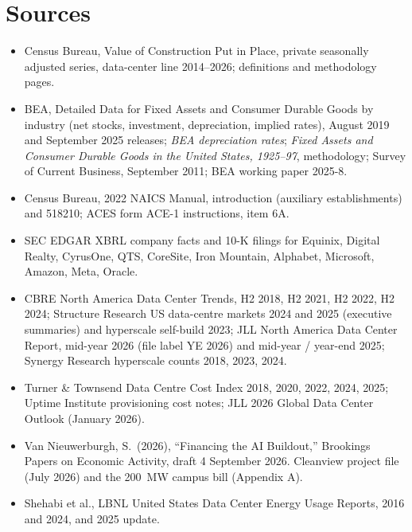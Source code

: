 \documentclass[11pt]{article}
\begin{document}
\section*{Sources}

\begin{itemize}
  \item Census Bureau, Value of Construction Put in Place, private seasonally adjusted series, data-center line 2014--2026; definitions and methodology pages.
  \item BEA, Detailed Data for Fixed Assets and Consumer Durable Goods by industry (net stocks, investment, depreciation, implied rates), August 2019 and September 2025 releases; \emph{BEA depreciation rates}; \emph{Fixed Assets and Consumer Durable Goods in the United States, 1925--97}, methodology; Survey of Current Business, September 2011; BEA working paper 2025-8.
  \item Census Bureau, 2022 NAICS Manual, introduction (auxiliary establishments) and 518210; ACES form ACE-1 instructions, item 6A.
  \item SEC EDGAR XBRL company facts and 10-K filings for Equinix, Digital Realty, CyrusOne, QTS, CoreSite, Iron Mountain, Alphabet, Microsoft, Amazon, Meta, Oracle.
  \item CBRE North America Data Center Trends, H2 2018, H2 2021, H2 2022, H2 2024; Structure Research US data-centre markets 2024 and 2025 (executive summaries) and hyperscale self-build 2023; JLL North America Data Center Report, mid-year 2026 (file label YE 2026) and mid-year / year-end 2025; Synergy Research hyperscale counts 2018, 2023, 2024.
  \item Turner \& Townsend Data Centre Cost Index 2018, 2020, 2022, 2024, 2025; Uptime Institute provisioning cost notes; JLL 2026 Global Data Center Outlook (January 2026).
  \item Van Nieuwerburgh, S.\ (2026), ``Financing the AI Buildout,'' Brookings Papers on Economic Activity, draft 4 September 2026. Cleanview project file (July 2026) and the 200~MW campus bill (Appendix A).
  \item Shehabi et al., LBNL United States Data Center Energy Usage Reports, 2016 and 2024, and 2025 update.
\end{itemize}
\end{document}
